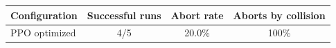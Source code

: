 \begin{tabular}{lccc}
\toprule
Configuration & Successful runs & Abort rate & Aborts by collision \\
\midrule
PPO optimized & 4/5 & 20.0\% & 100\% \\
\bottomrule
\end{tabular}
